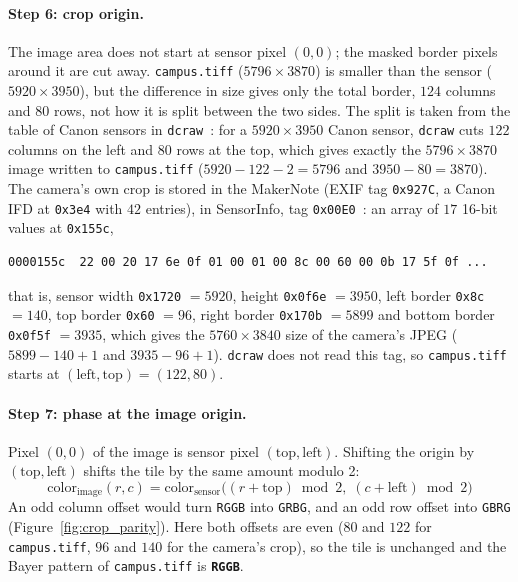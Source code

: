 \documentclass[a4paper]{article}
\begin{document}
\paragraph{Step 6: crop origin.} The image area does not start at sensor pixel $(0, 0)$; the masked border pixels around it are cut away. \texttt{campus.tiff} ($5796 \times 3870$) is smaller than the sensor ($5920 \times 3950$), but the difference in size gives only the total border, $124$ columns and $80$ rows, not how it is split between the two sides. The split is taken from the table of Canon sensors in \texttt{dcraw}~\cite{dcraw}: for a $5920 \times 3950$ Canon sensor, \texttt{dcraw} cuts $122$ columns on the left and $80$ rows at the top, which gives exactly the $5796 \times 3870$ image written to \texttt{campus.tiff} ($5920 - 122 - 2 = 5796$ and $3950 - 80 = 3870$). The camera's own crop is stored in the MakerNote (EXIF tag \texttt{0x927C}, a Canon IFD at \texttt{0x3e4} with $42$ entries), in SensorInfo, tag \texttt{0x00E0}~\cite{lclevy_cr2}: an array of $17$ 16-bit values at \texttt{0x155c},
\begin{lstlisting}[language={}, numbers=none]
0000155c  22 00 20 17 6e 0f 01 00 01 00 8c 00 60 00 0b 17 5f 0f ...
\end{lstlisting}
that is, sensor width \texttt{0x1720} $= 5920$, height \texttt{0x0f6e} $= 3950$, left border \texttt{0x8c} $= 140$, top border \texttt{0x60} $= 96$, right border \texttt{0x170b} $= 5899$ and bottom border \texttt{0x0f5f} $= 3935$, which gives the $5760 \times 3840$ size of the camera's JPEG ($5899 - 140 + 1$ and $3935 - 96 + 1$). \texttt{dcraw} does not read this tag, so \texttt{campus.tiff} starts at $(\text{left}, \text{top}) = (122, 80)$.

\paragraph{Step 7: phase at the image origin.} Pixel $(0, 0)$ of the image is sensor pixel $(\text{top}, \text{left})$. Shifting the origin by $(\text{top}, \text{left})$ shifts the tile by the same amount modulo 2:
\begin{equation}
    \text{color}_{\text{image}}(r, c) = \text{color}_{\text{sensor}}\big((r + \text{top}) \bmod 2,\; (c + \text{left}) \bmod 2\big)
\end{equation}
An odd column offset would turn \texttt{RGGB} into \texttt{GRBG}, and an odd row offset into \texttt{GBRG} (Figure~\ref{fig:crop_parity}). Here both offsets are even ($80$ and $122$ for \texttt{campus.tiff}, $96$ and $140$ for the camera's crop), so the tile is unchanged and the Bayer pattern of \texttt{campus.tiff} is \textbf{\texttt{RGGB}}.
\end{document}
